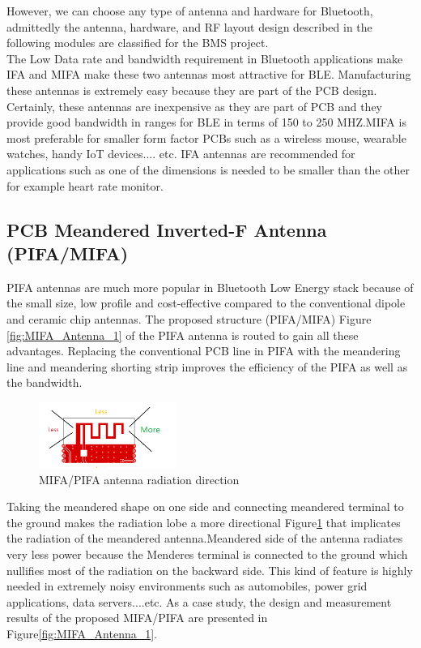 \indent However, we can choose any type of antenna and hardware for Bluetooth, admittedly the antenna, hardware, and RF layout design described in the following modules are classified for the BMS project.\\
\indent The Low Data rate and bandwidth requirement in Bluetooth applications make IFA and MIFA make these two antennas most attractive for BLE.  Manufacturing these antennas is extremely easy because they are part of the PCB design. Certainly, these antennas are inexpensive as they are part of PCB and they provide good bandwidth in ranges for BLE in terms of 150 to 250 MHZ.MIFA is most preferable for smaller form factor PCBs such as a wireless mouse, wearable watches, handy IoT devices.... etc. IFA antennas are recommended for applications such as one of the dimensions is needed to be smaller than the other for example heart rate monitor.

\subsection{PCB Meandered Inverted-F Antenna (PIFA/MIFA)}

PIFA antennas are much more popular in Bluetooth Low Energy stack because of the small size, low profile and cost-effective compared to the conventional dipole and ceramic chip antennas.
The proposed structure (PIFA/MIFA) Figure \ref{fig:MIFA_Antenna_1} of the PIFA antenna is routed to gain all these advantages.
Replacing the conventional PCB line in PIFA with the meandering line and meandering shorting strip
improves the efficiency of the PIFA as well as the bandwidth. 
\begin{figure}[h]
	\centering
	\includegraphics[width=0.4\textwidth]{Chap03/Figures/MIFA_Antenna_radiation_direction.PNG}
	\caption{MIFA/PIFA antenna radiation direction}
	\label{fig:MIFA_RADIATION_DIRECTION}
\end{figure}

Taking the meandered shape on one side and connecting meandered terminal to the ground makes the radiation lobe a more directional Figure\ref{fig:MIFA_RADIATION_DIRECTION} that implicates the radiation of the meandered antenna.Meandered side of the antenna radiates very less power because the Menderes terminal is connected to the ground which nullifies most of the radiation on the backward side. This kind of feature is highly needed in extremely noisy environments such as automobiles, power grid applications, data servers....etc.
As a case study, the design and measurement results of the
proposed MIFA/PIFA are presented \cite{PIFA2017Cheuk} in Figure\ref{fig:MIFA_Antenna_1}.


